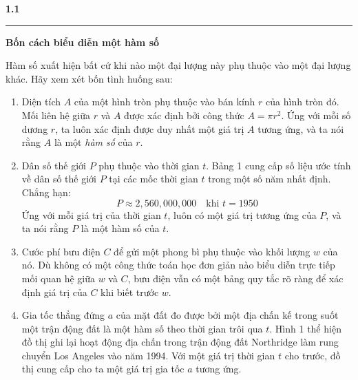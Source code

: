 \hfill
\begin{minipage}[t]{0.705\textwidth}
    \vspace*{-8pt}
    \noindent
    {\color{stewartcyan}\fontsize{15pt}{18pt}\selectfont\textbf{\textsf{1.1}}}%
    \hspace{6pt}%
    {\color{stewartcyan}\rule[-2pt]{0.8pt}{14pt}}%
    \hspace{6pt}%
    {\fontsize{15pt}{18pt}\selectfont\textbf{\textsf{Bốn cách biểu diễn một hàm số}}}
    
    \vspace{8pt}
    \vspace{3pt}

    Hàm số xuất hiện bất cứ khi nào một đại lượng này phụ thuộc vào một đại lượng khác. Hãy xem xét bốn tình huống sau:

    \begin{enumerate}[label=\textbf{\Alph*.}, leftmargin=1.5em, itemsep=1.5pt, topsep=2pt, parsep=0pt]
        \item Diện tích $A$ của một hình tròn phụ thuộc vào bán kính $r$ của hình tròn đó. Mối liên hệ giữa $r$ và $A$ được xác định bởi công thức $A = \pi r^2$. Ứng với mỗi số dương $r$, ta luôn xác định được duy nhất một giá trị $A$ tương ứng, và ta nói rằng $A$ là một \textit{hàm số} của $r$.

        \item Dân số thế giới $P$ phụ thuộc vào thời gian $t$. Bảng 1 cung cấp số liệu ước tính về dân số thế giới $P$ tại các mốc thời gian $t$ trong một số năm nhất định. Chẳng hạn:
        \[
        P \approx 2{,}560{,}000{,}000 \quad \text{khi } t = 1950
        \]
        Ứng với mỗi giá trị của thời gian $t$, luôn có một giá trị tương ứng của $P$, và ta nói rằng $P$ là một hàm số của $t$.

        \item Cước phí bưu điện $C$ để gửi một phong bì phụ thuộc vào khối lượng $w$ của nó. Dù không có một công thức toán học đơn giản nào biểu diễn trực tiếp mối quan hệ giữa $w$ và $C$, bưu điện vẫn có một bảng quy tắc rõ ràng để xác định giá trị của $C$ khi biết trước $w$.

        \item Gia tốc thẳng đứng $a$ của mặt đất đo được bởi một địa chấn kế trong suốt một trận động đất là một hàm số theo thời gian trôi qua $t$. Hình 1 thể hiện đồ thị ghi lại hoạt động địa chấn trong trận động đất Northridge làm rung chuyển Los Angeles vào năm 1994. Với một giá trị thời gian $t$ cho trước, đồ thị cung cấp cho ta một giá trị gia tốc $a$ tương ứng.
    \end{enumerate}


\end{minipage}
